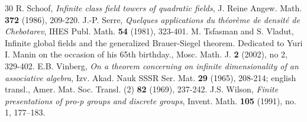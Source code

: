 \documentclass[12pt,a4paper,twoside,english]{smfart}
\begin{document}
\begin{thebibliography}{30}
 R. Schoof, {\em Infinite class field towers of quadratic fields}, J. Reine Angew. Math. {\bf 372} (1986), 209-220.
 J.-P. Serre, {\em Quelques applications du th\'eor\`eme de densit\'e de Chebotarev},  IHES Publ. Math. {\bf 54} (1981), 323-401.
  M. Tsfasman and S. Vladut, Infinite global fields and the generalized Brauer-Siegel theorem. Dedicated to Yuri I. Manin on the occasion of his 65th birthday., Mosc. Math. J. {\bf 2} (2002), no 2, 329-402.
  E.B. Vinberg, {\em On a theorem concerning on infinite dimensionality of an associative algebra}, Izv. Akad. Nauk SSSR Ser. Mat. {\bf 29} (1965), 208-214; english transl., Amer. Mat. Soc. Transl. (2) {\bf 82} (1969), 237-242.
  J.S. Wilson, {\em Finite presentations of pro-p groups and discrete groups},  Invent. Math. {\bf 105} (1991), no. 1, 177–183.
\end{thebibliography}
\end{document}
